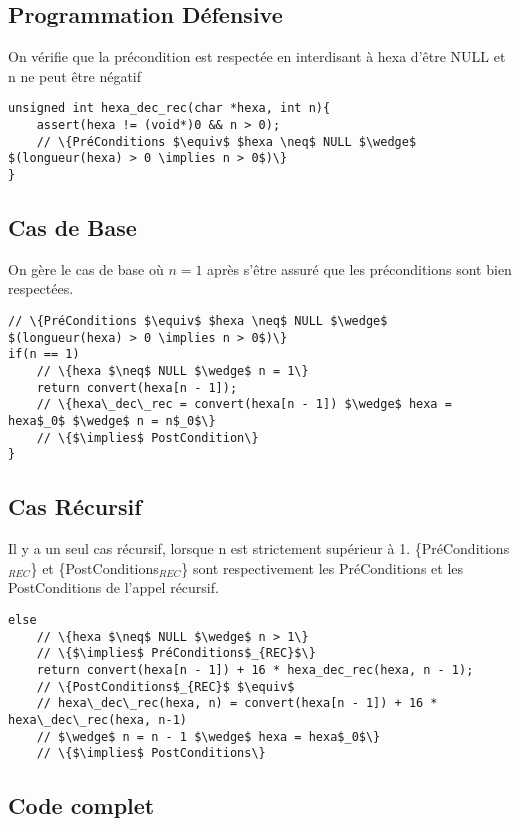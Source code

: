 \documentclass[a4paper, 11pt, oneside]{article}
\begin{document}
\subsection{Programmation Défensive}
On vérifie que la précondition est respectée en interdisant à hexa d'être NULL et n ne peut être négatif

\begin{lstlisting}
unsigned int hexa_dec_rec(char *hexa, int n){
    assert(hexa != (void*)0 && n > 0);
    // \{PréConditions $\equiv$ $hexa \neq$ NULL $\wedge$  $(longueur(hexa) > 0 \implies n > 0$)\}
}
\end{lstlisting}

\newpage

\subsection{Cas de Base}
On gère le cas de base où $n = 1$ après s'être assuré que les préconditions sont bien respectées.

\begin{lstlisting}
// \{PréConditions $\equiv$ $hexa \neq$ NULL $\wedge$  $(longueur(hexa) > 0 \implies n > 0$)\}
if(n == 1)
    // \{hexa $\neq$ NULL $\wedge$ n = 1\}
    return convert(hexa[n - 1]);
    // \{hexa\_dec\_rec = convert(hexa[n - 1]) $\wedge$ hexa = hexa$_0$ $\wedge$ n = n$_0$\}
    // \{$\implies$ PostCondition\}
}
\end{lstlisting}

\subsection{Cas Récursif}
Il y a un seul cas récursif, lorsque n est strictement supérieur à 1.
\{PréConditions$_{REC}$\} et \{PostConditions$_{REC}$\} sont respectivement les PréConditions et les PostConditions de l'appel récursif.

\begin{lstlisting}
else
    // \{hexa $\neq$ NULL $\wedge$ n > 1\}
    // \{$\implies$ PréConditions$_{REC}$\}
    return convert(hexa[n - 1]) + 16 * hexa_dec_rec(hexa, n - 1);
    // \{PostConditions$_{REC}$ $\equiv$ 
    // hexa\_dec\_rec(hexa, n) = convert(hexa[n - 1]) + 16 * hexa\_dec\_rec(hexa, n-1)
    // $\wedge$ n = n - 1 $\wedge$ hexa = hexa$_0$\}
    // \{$\implies$ PostConditions\}
\end{lstlisting}

\subsection{Code complet}
\end{document}
